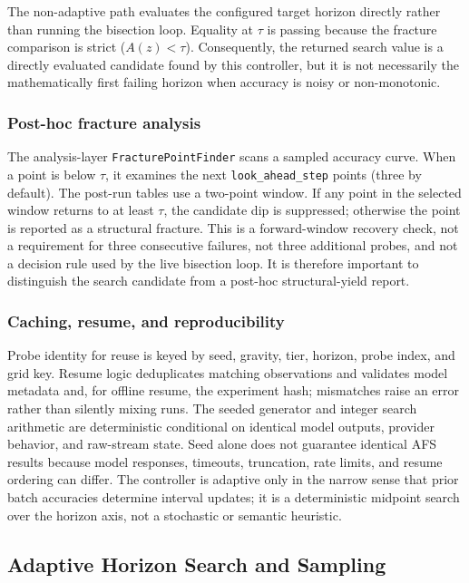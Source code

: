 \documentclass{article}
\begin{document}
The non-adaptive path evaluates the configured target horizon directly rather than running the bisection loop. Equality at $\tau$ is passing because the fracture comparison is strict ($A(z)<\tau$). Consequently, the returned search value is a directly evaluated candidate found by this controller, but it is not necessarily the mathematically first failing horizon when accuracy is noisy or non-monotonic.

\subsubsection{Post-hoc fracture analysis}
The analysis-layer \texttt{FracturePointFinder} scans a sampled accuracy curve. When a point is below $\tau$, it examines the next \texttt{look\_ahead\_step} points (three by default). The post-run tables use a two-point window. If any point in the selected window returns to at least $\tau$, the candidate dip is suppressed; otherwise the point is reported as a structural fracture. This is a forward-window recovery check, not a requirement for three consecutive failures, not three additional probes, and not a decision rule used by the live bisection loop. It is therefore important to distinguish the search candidate from a post-hoc structural-yield report.

\subsubsection{Caching, resume, and reproducibility}
Probe identity for reuse is keyed by seed, gravity, tier, horizon, probe index, and grid key. Resume logic deduplicates matching observations and validates model metadata and, for offline resume, the experiment hash; mismatches raise an error rather than silently mixing runs. The seeded generator and integer search arithmetic are deterministic conditional on identical model outputs, provider behavior, and raw-stream state. Seed alone does not guarantee identical AFS results because model responses, timeouts, truncation, rate limits, and resume ordering can differ. The controller is adaptive only in the narrow sense that prior batch accuracies determine interval updates; it is a deterministic midpoint search over the horizon axis, not a stochastic or semantic heuristic.

\subsection{Adaptive Horizon Search and Sampling}
\label{app:afs_sampling}
\end{document}
